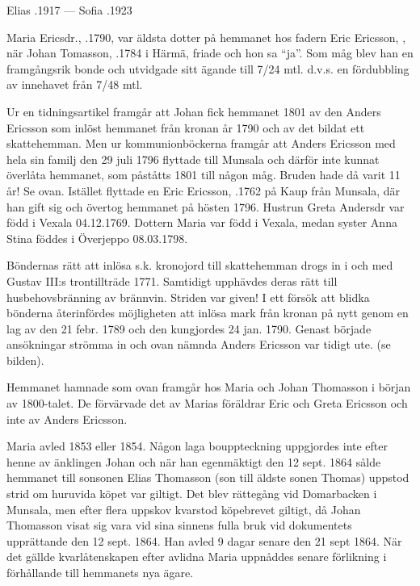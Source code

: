 Elias .1917 --- Sofia .1923


Maria Ericsdr., .1790, var äldsta dotter på hemmanet hos fadern Eric Ericsson, , när Johan Tomasson, .1784 i Härmä, friade och hon sa ``ja''. Som måg blev han en framgångsrik bonde och utvidgade sitt ägande till 7/24 mtl. d.v.s. en fördubbling av innehavet från 7/48 mtl.

Ur en tidningsartikel framgår att Johan fick hemmanet 1801 av den Anders Ericsson som inlöst hemmanet från kronan år 1790 och av det bildat ett skattehemman. Men ur kommunionböckerna framgår att Anders Ericsson med hela sin familj den 29 juli 1796 flyttade till Munsala och därför inte kunnat överlåta hemmanet, som påståtts
1801 till någon måg. Bruden hade då varit 11 år! Se ovan. Istället flyttade en Eric Ericsson, .1762 på Kaup från Munsala, där han gift sig och övertog hemmanet på hösten 1796. Hustrun Greta Andersdr var född i Vexala 04.12.1769. Dottern Maria var född i Vexala, medan syster Anna Stina föddes i Överjeppo 08.03.1798.

Böndernas rätt att inlösa s.k. kronojord till skattehemman drogs in i och med Gustav III:s trontillträde 1771. Samtidigt upphävdes deras rätt till husbehovsbränning av brännvin. Striden var given! I ett försök att blidka bönderna återinfördes möjligheten att inlösa mark från kronan på nytt genom en lag av den 21 febr. 1789 och den
kungjordes 24 jan. 1790. Genast började ansökningar strömma in och ovan nämnda Anders Ericsson var tidigt ute. (se bilden).



Hemmanet hamnade som ovan framgår hos Maria och Johan Thomasson i början av 1800-talet. De förvärvade det av Marias föräldrar Eric och Greta Ericsson och inte av Anders Ericsson.
\begin{jhchildren}
  \item {}
  \item {}
  \item {}
  \item {}
\end{jhchildren}
Maria avled 1853 eller 1854. Någon laga bouppteckning uppgjordes inte efter henne av änklingen Johan och när han egenmäktigt den 12 sept. 1864 sålde hemmanet till sonsonen Elias Thomasson (son till äldste sonen Thomas) uppstod strid om huruvida köpet var giltigt. Det blev rättegång vid Domarbacken i Munsala, men efter flera uppskov kvarstod köpebrevet giltigt, då Johan Thomasson visat sig vara vid sina sinnens fulla bruk vid dokumentets upprättande den 12 sept. 1864. Han avled 9 dagar senare den 21 sept 1864. När det gällde kvarlåtenskapen efter avlidna Maria uppnåddes senare förlikning i förhållande till hemmanets nya ägare.



